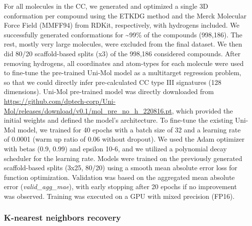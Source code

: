 For all molecules in the CC, we generated and optimized a single 3D conformation per compound using the ETKDG method\cite{riniker_better_2015} and the Merck Molecular Force Field (MMFF94) from RDKit, respectively, with hydrogens included. We successfully generated conformations for \textasciitilde99\% of the compounds (998,186). The rest, mostly very large molecules, were excluded from the final dataset. We then did 80/20 scaffold-based splits (x3) of the 998,186 considered compounds.
After removing hydrogens, all coordinates and atom-types for each molecule were used to fine-tune the pre-trained Uni-Mol model as a multitarget regression problem, so that we could directly infer pre-calculated CC type III signatures (128 dimensions). Uni-Mol pre-trained model was directly downloaded from \hyperlink{https://github.com/dptech-corp/Uni-Mol/releases/download/v0.1/mol_pre_no_h_220816.pt}{https://github.com/dptech-corp/Uni-Mol/releases/download/v0.1/mol\_pre\_no\_h\_220816.pt}, which provided the initial weights and defined the model’s architecture. To fine-tune the existing Uni-Mol model, we trained for 40 epochs with a batch size of 32 and a learning rate of 0.0001 (warm up ratio of 0.06 without dropout). We used the Adam optimizer with betas (0.9, 0.99) and epsilon 10-6, and we utilized a polynomial decay scheduler for the learning rate. Models were trained on the previously generated scaffold-based splits (3x25, 80/20) using a smooth mean absolute error loss for function optimization. Validation was based on the aggregated mean absolute error (\textit{valid\_agg\_mae}), with early stopping after 20 epochs if no improvement was observed. Training was executed on a GPU with mixed precision (FP16). 

\subsubsection{K-nearest neighbors recovery}

